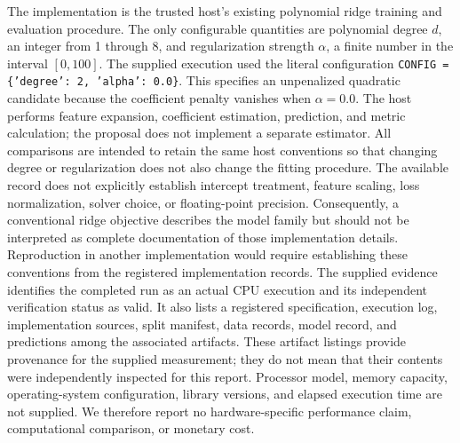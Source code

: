\documentclass[11pt]{article}
\begin{document}
The implementation is the trusted host's existing polynomial ridge training and evaluation procedure. The only configurable quantities are polynomial degree \(d\), an integer from 1 through 8, and regularization strength \(\alpha\), a finite number in the interval \([0,100]\). The supplied execution used the literal configuration \texttt{CONFIG = \{'degree': 2, 'alpha': 0.0\}}. This specifies an unpenalized quadratic candidate because the coefficient penalty vanishes when \(\alpha=0.0\). The host performs feature expansion, coefficient estimation, prediction, and metric calculation; the proposal does not implement a separate estimator. All comparisons are intended to retain the same host conventions so that changing degree or regularization does not also change the fitting procedure. The available record does not explicitly establish intercept treatment, feature scaling, loss normalization, solver choice, or floating-point precision. Consequently, a conventional ridge objective describes the model family but should not be interpreted as complete documentation of those implementation details. Reproduction in another implementation would require establishing these conventions from the registered implementation records. The supplied evidence identifies the completed run as an actual CPU execution and its independent verification status as valid. It also lists a registered specification, execution log, implementation sources, split manifest, data records, model record, and predictions among the associated artifacts. These artifact listings provide provenance for the supplied measurement; they do not mean that their contents were independently inspected for this report. Processor model, memory capacity, operating-system configuration, library versions, and elapsed execution time are not supplied. We therefore report no hardware-specific performance claim, computational comparison, or monetary cost.
\end{document}
